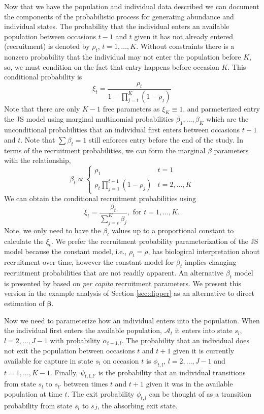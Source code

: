 \documentclass[12pt]{article}
\begin{document}
Now that we have the population and individual data described we can document the components of the probabilistic process for generating abundance and individual states. The probability that the individual enters an available population between occasions $t-1$ and $t$ given it has not already entered (recruitment) is denoted by $\rho_t$, $t=1,\dots,K$. Without constraints there is a nonzero probability that the individual may not enter the population before $K$, so, we must condition on the fact that entry happens before occasion $K$. This conditional probability is 
\[
\xi_t = \frac{\rho_t}{1-\prod_{j=t}^{K} (1-\rho_j)}
\]
Note that there are only $K-1$ free parameters as $\xi_K \equiv 1$. \citet{schwarz1996general} and \cite{crosbie1985parsimonious} parmeterized entry the JS model using marginal multinomial probabilities $\beta_1,\dots,\beta_K$ which are the unconditional probabilities that an individual first enters between occasions $t-1$ and $t$. Note that $\sum \beta_t = 1$ still enforces entry before the end of the study. In terms of the recruitment probabilities, we can form the marginal $\beta$ parameters with the relationship,
\[
\beta_t \propto \left\{ \begin{array}{ll}
\rho_1  & t=1\\
\rho_t \prod_{j=1}^{t-1} (1-\rho_j) & t=2,\dots,K
\end{array} \right.
\]
We can obtain the conditional recruitment probabilities using  
\[
\xi_t = \frac{\beta_t}{\sum_{j=t}^K\beta_j}, \text{ for } t=1,\dots,K.
\]
Note, we only need to have the $\beta_t$ values up to a proportional constant to calculate the $\xi_t$. We prefer the recruitment probability parameterization of the JS model because the constant model, i.e., $\rho_t=\rho$, has biological interpretation about recruitment over time, however the constant model for $\beta_t$ implies changing recruitment probabilities that are not readily apparent. An alternative $\beta_t$ model is presented by \cite{link2005modeling} based on {\it per capita} recruitment parameters. We present this version in the example analysis of Section \ref{sec:dipper} as an alternative to direct estimation of $\boldsymbol{\beta}$.

Now we need to parameterize how an individual enters into the population. When the individual first enters the available population, $\mathcal{A}_t$ it enters into state $s_l$, $l=2,\dots,J-1$ with probability $\alpha_{t-1,l}$. The probability that an individual does not exit the population between occasions $t$ and $t+1$ given it is currently available for capture in state $s_l$ on occasion $t$ is $\phi_{t,l}$, $l=2,\dots,J-1$ and $t=1,\dots,K-1$. Finally, $\psi_{t,l,l'}$ is the probability that an individual transitions from state $s_l$ to $s_{l'}$ between times $t$ and $t+1$ given it was in the available population at time $t$. The exit probability $\phi_{t,l}$ can be thought of as a transition probability from state $s_l$ to $s_J$, the absorbing exit state. 
\end{document}
